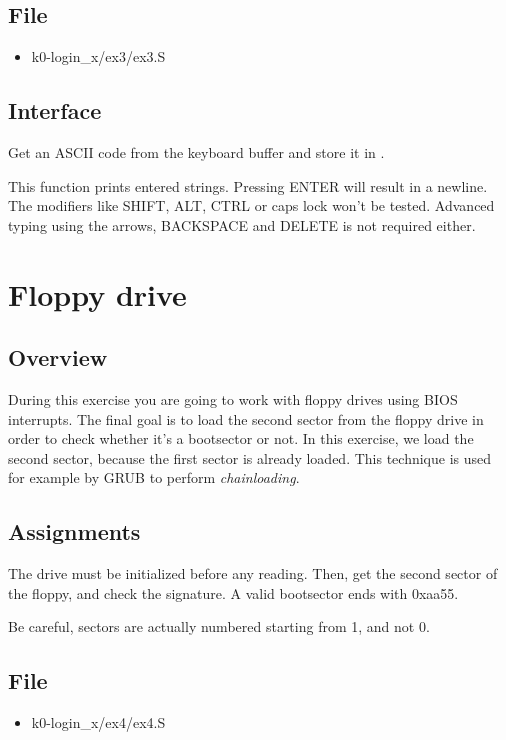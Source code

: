 \subsection*{File}
\begin{itemize}
  \item k0-login\_x/ex3/ex3.S
\end{itemize}

\subsection*{Interface}
{
  Get an ASCII code from the keyboard buffer and store it in .
}

{
  This function prints entered strings. Pressing ENTER will result in a
  newline.
  The modifiers like SHIFT, ALT, CTRL or caps lock won't be tested. Advanced
  typing using the arrows, BACKSPACE and DELETE is not required either.
}

%
%

\newpage

\section{Floppy drive}

\subsection*{Overview}
During this exercise you are going to work with floppy drives using BIOS
interrupts. The final goal is to load the second sector from the floppy drive
in order to check whether it's a bootsector or not. In this exercise, we load the
second sector, because the first sector is already loaded. This technique is used
for example by GRUB to perform \emph{chainloading}.

\subsection*{Assignments}
The drive must be initialized before any reading. Then, get the second sector of
the floppy, and check the signature. A valid bootsector ends with 0xaa55.

Be careful, sectors are actually numbered starting from 1, and not 0.

\subsection*{File}
\begin{itemize}
  \item k0-login\_x/ex4/ex4.S
\end{itemize}

